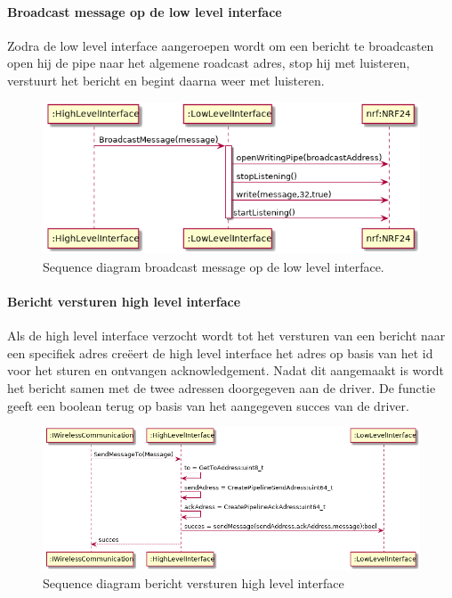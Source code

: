 \documentclass[a4paper, 11pt, oneside]{report}
\begin{document}
\paragraph{Broadcast message op de low level interface}
\label{DetailedDesign:NRF24:sequence:lowlevelBroadcastMessage}
Zodra de low level interface aangeroepen wordt om een bericht te broadcasten open hij de pipe naar het algemene roadcast adres, stop hij met luisteren, verstuurt het bericht en begint daarna weer met luisteren.
\begin{figure}[H]
	\begin{center}\includegraphics[width=.8\linewidth]{UML/out/NRF24/sequence/lowlevelBroadcastMessage/lowlevelBroadcastMessage.png}\end{center}
	\caption{Sequence diagram broadcast message op de low level interface.}
	\label{fig:NRF24:sequence:lowlevelBroadcastMessage}
\end{figure}

\paragraph{Bericht versturen high level interface }
\label{DetailedDesign:NRF24:sequence:highlevelSendMessage}
Als de high level interface verzocht wordt tot het versturen van een bericht naar een specifiek adres creëert de high level interface het adres op basis van het id voor het sturen en ontvangen acknowledgement. Nadat dit aangemaakt is wordt het bericht samen met de twee adressen doorgegeven aan de driver.
De functie geeft een boolean terug op basis van het aangegeven succes van de driver.
\begin{figure}[H]
	\begin{center}\includegraphics[width=1\linewidth]{UML/out/NRF24/sequence/highlevelSendMessage/highlevelSendMessage.png}\end{center}
	\caption{Sequence diagram bericht versturen high level interface }
	\label{fig:NRF24:sequence:highlevelSendMessage}
\end{figure}
\end{document}
